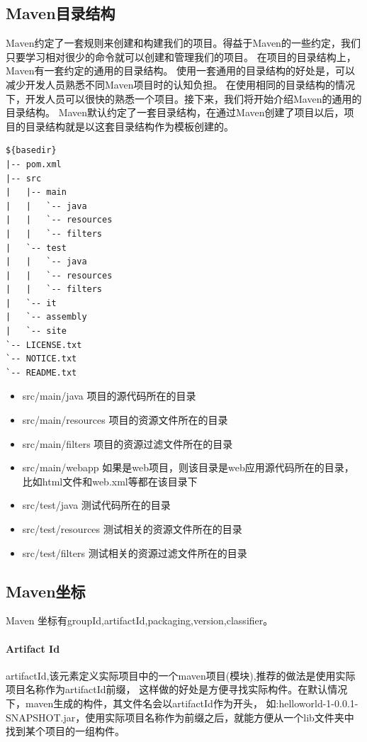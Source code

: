 \documentclass{book}
\begin{document}
\subsection{Maven目录结构}

Maven约定了一套规则来创建和构建我们的项目。得益于Maven的一些约定，我们只要学习相对很少的命令就可以创建和管理我们的项目。
在项目的目录结构上，Maven有一套约定的通用的目录结构。
使用一套通用的目录结构的好处是，可以减少开发人员熟悉不同Maven项目时的认知负担。
在使用相同的目录结构的情况下，开发人员可以很快的熟悉一个项目。接下来，我们将开始介绍Maven的通用的目录结构。
Maven默认约定了一套目录结构，在通过Maven创建了项目以后，项目的目录结构就是以这套目录结构作为模板创建的。

\begin{lstlisting}
${basedir}
|-- pom.xml
|-- src
|   |-- main
|   |   `-- java
|   |   `-- resources
|   |   `-- filters
|   `-- test
|   |   `-- java
|   |   `-- resources
|   |   `-- filters
|   `-- it
|   `-- assembly
|   `-- site
`-- LICENSE.txt
`-- NOTICE.txt
`-- README.txt
\end{lstlisting}


\begin{itemize}
	\item{src/main/java 项目的源代码所在的目录}
	\item{src/main/resources 项目的资源文件所在的目录}
	\item{src/main/filters 项目的资源过滤文件所在的目录}
	\item{src/main/webapp 如果是web项目，则该目录是web应用源代码所在的目录，比如html文件和web.xml等都在该目录下}
	\item{src/test/java 测试代码所在的目录}
	\item{src/test/resources 测试相关的资源文件所在的目录}
	\item{src/test/filters 测试相关的资源过滤文件所在的目录}
\end{itemize} 

\subsection{Maven坐标}

Maven 坐标有groupId,artifactId,packaging,version,classifier。

\paragraph{Artifact Id}
artifactId,该元素定义实际项目中的一个maven项目(模块),推荐的做法是使用实际项目名称作为artifactId前缀，
这样做的好处是方便寻找实际构件。在默认情况下，maven生成的构件，其文件名会以artifactId作为开头，
如:helloworld-1-0.0.1-SNAPSHOT.jar，使用实际项目名称作为前缀之后，就能方便从一个lib文件夹中找到某个项目的一组构件。
\end{document}
